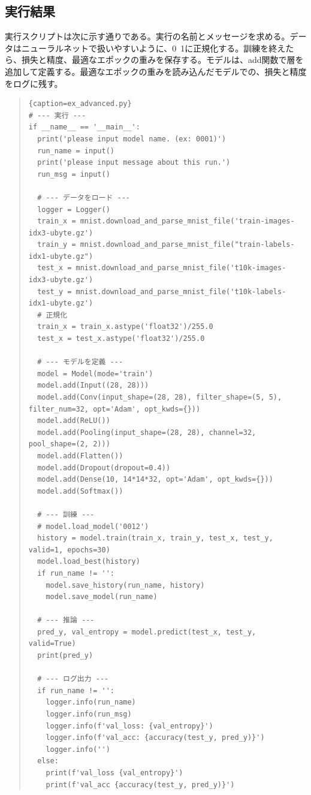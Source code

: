 \documentclass[platex,dvipdfmx]{jsarticle}
\begin{document}
\subsection{実行結果}

実行スクリプトは次に示す通りである。実行の名前とメッセージを求める。データはニューラルネットで扱いやすいように、0~1に正規化する。訓練を終えたら、損失と精度、最適なエポックの重みを保存する。モデルは、add関数で層を追加して定義する。最適なエポックの重みを読み込んだモデルでの、損失と精度をログに残す。

\begin{quote}
\begin{lstlisting}{caption=ex_advanced.py}
# --- 実行 ---
if __name__ == '__main__': 
  print('please input model name. (ex: 0001)')
  run_name = input()
  print('please input message about this run.')
  run_msg = input()

  # --- データをロード ---
  logger = Logger()
  train_x = mnist.download_and_parse_mnist_file('train-images-idx3-ubyte.gz')
  train_y = mnist.download_and_parse_mnist_file("train-labels-idx1-ubyte.gz")
  test_x = mnist.download_and_parse_mnist_file('t10k-images-idx3-ubyte.gz')
  test_y = mnist.download_and_parse_mnist_file('t10k-labels-idx1-ubyte.gz')
  # 正規化
  train_x = train_x.astype('float32')/255.0
  test_x = test_x.astype('float32')/255.0

  # --- モデルを定義 ---
  model = Model(mode='train')
  model.add(Input((28, 28)))
  model.add(Conv(input_shape=(28, 28), filter_shape=(5, 5), filter_num=32, opt='Adam', opt_kwds={}))
  model.add(ReLU())
  model.add(Pooling(input_shape=(28, 28), channel=32, pool_shape=(2, 2)))
  model.add(Flatten())
  model.add(Dropout(dropout=0.4))
  model.add(Dense(10, 14*14*32, opt='Adam', opt_kwds={}))
  model.add(Softmax())

  # --- 訓練 ---
  # model.load_model('0012')
  history = model.train(train_x, train_y, test_x, test_y, valid=1, epochs=30)
  model.load_best(history)
  if run_name != '':
    model.save_history(run_name, history)
    model.save_model(run_name)
  
  # --- 推論 ---
  pred_y, val_entropy = model.predict(test_x, test_y, valid=True)
  print(pred_y)

  # --- ログ出力 ---
  if run_name != '':
    logger.info(run_name)
    logger.info(run_msg)
    logger.info(f'val_loss: {val_entropy}')
    logger.info(f'val_acc: {accuracy(test_y, pred_y)}')
    logger.info('')
  else:
    print(f'val_loss {val_entropy}')
    print(f'val_acc {accuracy(test_y, pred_y)}')
\end{lstlisting}
\end{quote}
\end{document}
